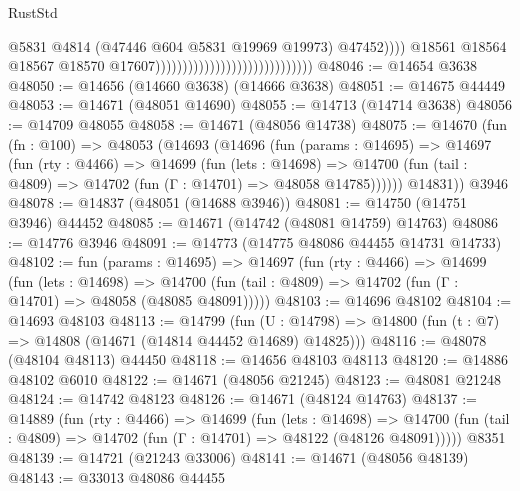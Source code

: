 \begin{lexlean}{RustStd}
\begin{coremodule}
                                                                      @5831
                                                                      @4814
                                                                      (@47446
                                                                        @604
                                                                        @5831
                                                                        @19969
                                                                        @19973)
                                                                      @47452))))
                                                              @18561
                                                              @18564
                                                              @18567
                                                              @18570
                                                              @17607)))))))))))))))))))))))))))))
@48046 := @14654 @3638
@48050 := @14656 (@14660 @3638) (@14666 @3638)
@48051 := @14675 @44449
@48053 := @14671 (@48051 @14690)
@48055 := @14713 (@14714 @3638)
@48056 := @14709 @48055
@48058 := @14671 (@48056 @14738)
@48075 := @14670
    (fun (fn : @100) =>
    @48053
      (@14693
        (@14696
          (fun (params : @14695) =>
          @14697
            (fun (rty : @4466) =>
            @14699
              (fun (lets : @14698) =>
              @14700 (fun (tail : @4809) => @14702 (fun (Γ : @14701) => @48058 @14785))))))
        @14831))
    @3946
@48078 := @14837 (@48051 (@14688 @3946))
@48081 := @14750 (@14751 @3946) @44452
@48085 := @14671 (@14742 (@48081 @14759) @14763)
@48086 := @14776 @3946
@48091 := @14773 (@14775 @48086 @44455 @14731 @14733)
@48102 := fun (params : @14695) =>
  @14697
    (fun (rty : @4466) =>
    @14699
      (fun (lets : @14698) =>
      @14700 (fun (tail : @4809) => @14702 (fun (Γ : @14701) => @48058 (@48085 @48091)))))
@48103 := @14696 @48102
@48104 := @14693 @48103
@48113 := @14799
    (fun (U : @14798) => @14800 (fun (t : @7) => @14808 (@14671 (@14814 @44452 @14689) @14825)))
@48116 := @48078 (@48104 @48113) @44450
@48118 := @14656 @48103 @48113
@48120 := @14886 @48102 @6010
@48122 := @14671 (@48056 @21245)
@48123 := @48081 @21248
@48124 := @14742 @48123
@48126 := @14671 (@48124 @14763)
@48137 := @14889
    (fun (rty : @4466) =>
    @14699
      (fun (lets : @14698) =>
      @14700 (fun (tail : @4809) => @14702 (fun (Γ : @14701) => @48122 (@48126 @48091)))))
    @8351
@48139 := @14721 (@21243 @33006)
@48141 := @14671 (@48056 @48139)
@48143 := @33013 @48086 @44455

\end{coremodule}
\end{lexlean}
